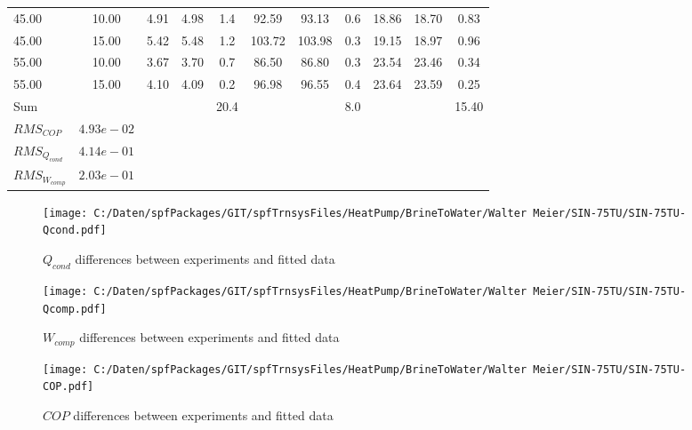 \documentclass[english]{SPFShortReport}
\begin{document}
\begin{table}[!ht]
\begin{small}
\begin{center}
{\begin{tabular}{l | c c c c c c c c c c }
45.00  & 10.00 & 4.91 & 4.98 & 1.4 & 92.59 & 93.13 & 0.6 & 18.86 & 18.70 & 0.83\\ 
45.00  & 15.00 & 5.42 & 5.48 & 1.2 & 103.72 & 103.98 & 0.3 & 19.15 & 18.97 & 0.96\\ 
55.00  & 10.00 & 3.67 & 3.70 & 0.7 & 86.50 & 86.80 & 0.3 & 23.54 & 23.46 & 0.34\\ 
55.00  & 15.00 & 4.10 & 4.09 & 0.2 & 96.98 & 96.55 & 0.4 & 23.64 & 23.59 & 0.25\\ 
\hline 
 Sum &  & &  & 20.4 &  &  & 8.0 & &  & 15.40\\ 
\hline 
 $RMS_{COP}$ & $4.93e-02$ \\ 
 $RMS_{Q_{cond}}$ & $4.14e-01$ \\ 
 $RMS_{W_{comp}}$ & $2.03e-01$ \\ 
\hline
\hline
\end{tabular}
}
\label{ErrorsTable}
\end{center}
\end{small}
\end{table}
\begin{figure}[!ht]
\begin{center}
\texttt{[image: C:/Daten/spfPackages/GIT/spfTrnsysFiles/HeatPump/BrineToWater/Walter Meier/SIN-75TU/SIN-75TU-Qcond.pdf]}
\caption{$Q_{cond}$ differences between experiments and fitted data}
\label{QcongFig}
\end{center}
\end{figure}
\begin{figure}[!ht]
\begin{center}
\texttt{[image: C:/Daten/spfPackages/GIT/spfTrnsysFiles/HeatPump/BrineToWater/Walter Meier/SIN-75TU/SIN-75TU-Qcomp.pdf]}
\caption{$W_{comp}$ differences between experiments and fitted data}
\label{QcompFig}
\end{center}
\end{figure}
\begin{figure}[!ht]
\begin{center}
\texttt{[image: C:/Daten/spfPackages/GIT/spfTrnsysFiles/HeatPump/BrineToWater/Walter Meier/SIN-75TU/SIN-75TU-COP.pdf]}
\caption{$COP$ differences between experiments and fitted data}
\label{COPFig}
\end{center}
\end{figure}
\end{document}
